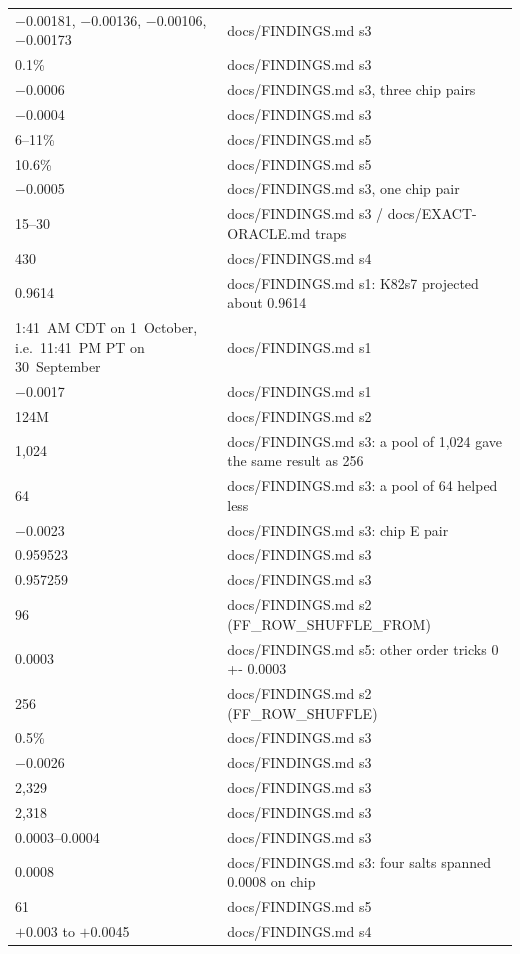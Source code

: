 \begin{longtable}{@{}p{3.6cm}p{12.0cm}@{}}
\ensuremath{-}0.00181, \ensuremath{-}0.00136, \ensuremath{-}0.00106, \ensuremath{-}0.00173 & docs/FINDINGS.md s3 \\
0.1\% & docs/FINDINGS.md s3 \\
\ensuremath{-}0.0006 & docs/FINDINGS.md s3, three chip pairs \\
\ensuremath{-}0.0004 & docs/FINDINGS.md s3 \\
6--11\% & docs/FINDINGS.md s5 \\
10.6\% & docs/FINDINGS.md s5 \\
\ensuremath{-}0.0005 & docs/FINDINGS.md s3, one chip pair \\
15--30 & docs/FINDINGS.md s3 / docs/EXACT-ORACLE.md traps \\
430 & docs/FINDINGS.md s4 \\
0.9614 & docs/FINDINGS.md s1: K82s7 projected about 0.9614 \\
1:41~AM CDT on 1~October, i.e.\ 11:41~PM PT on 30~September & docs/FINDINGS.md s1 \\
\ensuremath{-}0.0017 & docs/FINDINGS.md s1 \\
124M & docs/FINDINGS.md s2 \\
1{,}024 & docs/FINDINGS.md s3: a pool of 1,024 gave the same result as 256 \\
64 & docs/FINDINGS.md s3: a pool of 64 helped less \\
\ensuremath{-}0.0023 & docs/FINDINGS.md s3: chip E pair \\
0.959523 & docs/FINDINGS.md s3 \\
0.957259 & docs/FINDINGS.md s3 \\
96 & docs/FINDINGS.md s2 (FF\_ROW\_SHUFFLE\_FROM) \\
0.0003 & docs/FINDINGS.md s5: other order tricks 0 +- 0.0003 \\
256 & docs/FINDINGS.md s2 (FF\_ROW\_SHUFFLE) \\
0.5\% & docs/FINDINGS.md s3 \\
\ensuremath{-}0.0026 & docs/FINDINGS.md s3 \\
2{,}329 & docs/FINDINGS.md s3 \\
2{,}318 & docs/FINDINGS.md s3 \\
0.0003--0.0004 & docs/FINDINGS.md s3 \\
0.0008 & docs/FINDINGS.md s3: four salts spanned 0.0008 on chip \\
61 & docs/FINDINGS.md s5 \\
\ensuremath{+}0.003 to \ensuremath{+}0.0045 & docs/FINDINGS.md s4 \\

\end{longtable}
